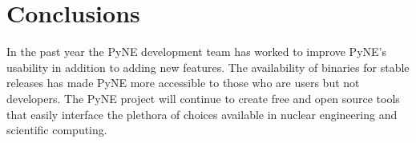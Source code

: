 \documentclass{anstrans}
\begin{document}
\section{Conclusions}

In the past year the PyNE development team has worked to improve PyNE's usability in addition to adding new features. The availability of binaries for stable releases has made PyNE more accessible to those who are users but not developers. The PyNE project will continue to create free and open source tools that easily interface the plethora of choices available in nuclear engineering and scientific computing. 

 
 
\end{document}
